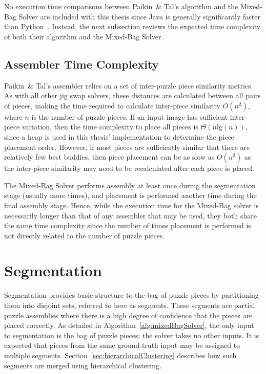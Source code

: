 No execution time comparisons between Paikin~\& Tal's algorithm and the Mixed-Bag Solver are included with this thesis since Java is generally significantly faster than Python~\cite{pythonJavaComparison}.  Instead, the next subsection reviews the expected time complexity of both their algorithm and the Mixed-Bag Solver.

\subsection{Assembler Time Complexity}\label{sec:assemblerTimeComplexity}

Paikin~\& Tal's assembler relies on a set of inter-puzzle piece similarity metrics.  As with all other jig swap solvers, these distances are calculated between all pairs of pieces, making the time required to calculate inter-piece similarity $O(n^2)$, where $n$ is the number of puzzle pieces.  If an input image has sufficient inter-piece variation, then the time complexity to place all pieces is $\Theta(n \text{lg}(n))$, since a heap is used in this thesis' implementation to determine the piece placement order.  However, if most pieces are sufficiently similar that there are relatively few best buddies, then piece placement can be as slow as $O(n^3)$ as the inter-piece similarity may need to be recalculated after each piece is placed.

The Mixed-Bag Solver performs assembly at least once during the segmentation stage (usually more times), and placement is performed another time during the final assembly stage.  Hence, while the execution time for the Mixed-Bag solver is necessarily longer than that of any assembler that may be used, they both share the same time complexity since the number of times placement is performed is not directly related to the number of puzzle pieces.

\section{Segmentation}\label{sec:Segmentation}

Segmentation provides basic structure to the bag of puzzle pieces by partitioning them into disjoint sets, referred to here as segments.  These segments are partial puzzle assemblies where there is a high degree of confidence that the pieces are placed correctly. As detailed in Algorithm~\ref{alg:mixedBagSolver}, the only input to segmentation is the bag of puzzle pieces; the solver takes no other inputs.  It is expected that pieces from the same ground-truth input may be assigned to multiple segments.  Section~\ref{sec:hierarchicalClustering} describes how such segments are merged using hierarchical clustering.

